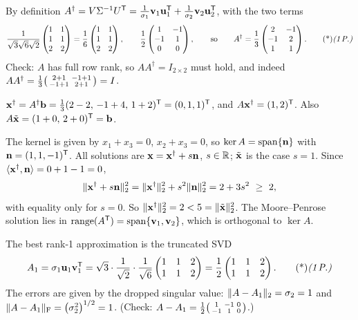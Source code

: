 \begin{solution}
 By definition $A^\dagger=V\Sigma^{-1}U^{\mathsf{T}}=\frac1{\sigma_1}\mathbf{v}_1\mathbf{u}_1^{\mathsf{T}}+\frac1{\sigma_2}\mathbf{v}_2\mathbf{u}_2^{\mathsf{T}}$, with the two terms
\[
\frac{1}{\sqrt3\sqrt6\sqrt2}\begin{pmatrix}1&1\\1&1\\2&2\end{pmatrix}=\frac16\begin{pmatrix}1&1\\1&1\\2&2\end{pmatrix},\qquad
\frac12\begin{pmatrix}1&-1\\-1&1\\0&0\end{pmatrix},
\qquad\text{so}\qquad
A^\dagger=\frac13\begin{pmatrix}2&-1\\-1&2\\1&1\end{pmatrix}.\ptd{1}
\]
Check: $A$ has full row rank, so $AA^\dagger=I_{2\times2}$ must hold, and indeed $AA^\dagger=\frac13\begin{psmallmatrix}2+1&-1+1\\-1+1&2+1\end{psmallmatrix}=I$. 

 $\mathbf{x}^\dagger=A^\dagger\mathbf{b}=\frac13(2-2,\,-1+4,\,1+2)^{\mathsf{T}}=(0,1,1)^{\mathsf{T}}$, and $A\mathbf{x}^\dagger=(1,2)^{\mathsf{T}}$. Also $A\tilde{\mathbf{x}}=(1+0,\,2+0)^{\mathsf{T}}=\mathbf{b}$. 

The kernel is given by $x_1+x_3=0$, $x_2+x_3=0$, so $\ker A=\operatorname{span}\{\mathbf{n}\}$ with $\mathbf{n}=(1,1,-1)^{\mathsf{T}}$. All solutions are $\mathbf{x}=\mathbf{x}^\dagger+s\mathbf{n}$, $s\in\mathbb{R}$; $\tilde{\mathbf{x}}$ is the case $s=1$. Since $\langle \mathbf{x}^\dagger,\mathbf{n}\rangle=0+1-1=0$,
\[
\lVert \mathbf{x}^\dagger+s\mathbf{n}\rVert_2^2=\lVert \mathbf{x}^\dagger\rVert_2^2+s^2\lVert \mathbf{n}\rVert_2^2=2+3s^2\ \ge\ 2,
\]
with equality only for $s=0$. So $\lVert \mathbf{x}^\dagger\rVert_2^2=2<5=\lVert \tilde{\mathbf{x}}\rVert_2^2$. The Moore--Penrose solution lies in $\operatorname{range}(A^{\mathsf{T}})=\operatorname{span}\{\mathbf{v}_1,\mathbf{v}_2\}$, which is orthogonal to $\ker A$. 

 The best rank-1 approximation is the truncated SVD
\[
A_1=\sigma_1\vb u_1\vb v_1\T=\sqrt3\cdot\frac1{\sqrt2}\cdot\frac1{\sqrt6}\begin{pmatrix}1&1&2\\1&1&2\end{pmatrix}=\frac12\begin{pmatrix}1&1&2\\1&1&2\end{pmatrix}.\ptd{1}
\]
The errors are given by the dropped singular value: $\lVert A-A_1\rVert_2=\sigma_2=1$ and $\lVert A-A_1\rVert_{\mathrm F}=\big(\sigma_2^2\big)^{1/2}=1$. (Check: $A-A_1=\frac12\begin{psmallmatrix}1&-1&0\\-1&1&0\end{psmallmatrix}$.) 


\end{solution}
